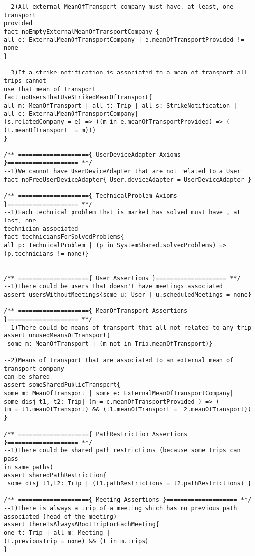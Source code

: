 \documentclass[a4paper,leqno]{book}
\begin{document}
\begin{lstlisting}
--2)All external MeanOfTransport company must have, at least, one transport 
provided
fact noEmptyExternalMeanOfTransportCompany {
all e: ExternalMeanOfTransportCompany | e.meanOfTransportProvided != none
}

--3)If a strike notification is associated to a mean of transport all trips cannot
use that mean of transport
fact noUsersThatUseStrikedMeanOfTransport{
all m: MeanOfTransport | all t: Trip | all s: StrikeNotification | 
all e: ExternalMeanOfTransportCompany|
(s.relatedCompany = e) => ((m in e.meanOfTransportProvided) => (
(t.meanOfTransport != m)))
}

/** ===================={ UserDeviceAdapter Axioms }==================== **/
--1)We cannot have UserDeviceAdapter that are not related to a User
fact noFreeUserDeviceAdapter{ User.deviceAdapter = UserDeviceAdapter }

/** ===================={ TechnicalProblem Axioms }==================== **/
--1)Each technical problem that is marked has solved must have , at last, one
technician associated
fact techniciansForSolvedProblems{
all p: TechnicalProblem | (p in SystemShared.solvedProblems) => 
(p.technicians != none)}


/** ===================={ User Assertions }==================== **/
--1)There could be users that doesn't have meetings associated
assert usersWithoutMeetings{some u: User | u.scheduledMeetings = none}

/** ===================={ MeanOfTransport Assertions }==================== **/
--1)There could be means of transport that all not related to any trip
assert unusedMeansOfTransport{
 some m: MeanOfTransport | (m not in Trip.meanOfTransport)}

--2)Means of transport that are associated to an external mean of transport company 
can be shared
assert someSharedPublicTransport{
some m: MeanOfTransport | some e: ExternalMeanOfTransportCompany| 
some disj t1, t2: Trip| (m = e.meanOfTransportProvided ) => (
(m = t1.meanOfTransport) && (t1.meanOfTransport = t2.meanOfTransport))
}

/** ===================={ PathRestriction Assertions }==================== **/
--1)There could be shared path restrictions (because some trips can pass
in same paths)
assert sharedPathRestriction{
 some disj t1,t2: Trip | (t1.pathRestrictions = t2.pathRestrictions) }

/** ===================={ Meeting Assertions }==================== **/
--1)There is always a trip of a meeting which has no previous path
associated (head of the meeting)
assert thereIsAlwaysARootTripForEachMeeting{
one t: Trip | all m: Meeting |
(t.previousTrip = none) && (t in m.trips)
}


\end{lstlisting}
\end{document}

